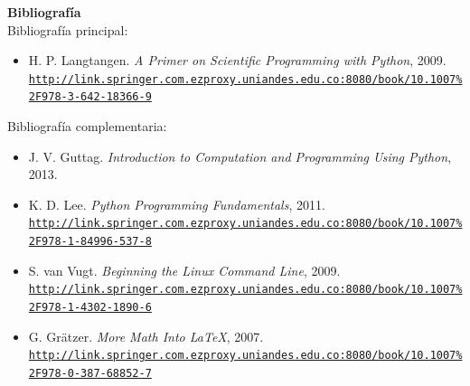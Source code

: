 \documentclass[letterpaper,10pt,onecolumn]{article}
\begin{document}
\noindent\textbf{\large {} \quad Bibliografía}\\[-0.2cm]

\noindent\normalsize Bibliografía principal:


\begin{itemize}
	\item H. P. Langtangen. \textit{A Primer on Scientific Programming with Python}, 2009.\\
	\href{http://link.springer.com.ezproxy.uniandes.edu.co:8080/book/10.1007\%2F978-3-642-18366-9}{\nolinkurl{http://link.springer.com.ezproxy.uniandes.edu.co:8080/book/10.1007\%2F978-3-642-18366-9}}\\[-0.6cm]
\end{itemize}

\noindent\normalsize Bibliografía complementaria:

\begin{itemize}
	\item J. V. Guttag. \textit{Introduction to Computation and Programming Using Python}, 2013.
	\item K. D. Lee. \textit{Python Programming Fundamentals}, 2011. \\
	\href{http://link.springer.com.ezproxy.uniandes.edu.co:8080/book/10.1007\%2F978-1-84996-537-8}{\nolinkurl{http://link.springer.com.ezproxy.uniandes.edu.co:8080/book/10.1007\%2F978-1-84996-537-8}}\\[-0.6cm]
	\item S. van Vugt. \textit{Beginning the Linux Command Line}, 2009.\\
	\href{http://link.springer.com.ezproxy.uniandes.edu.co:8080/book/10.1007\%2F978-1-4302-1890-6}{\nolinkurl{http://link.springer.com.ezproxy.uniandes.edu.co:8080/book/10.1007\%2F978-1-4302-1890-6}}\\[-0.6cm]
	\item G. Gr\"atzer. \textit{More Math Into  \LaTeX}, 2007.\\
	\href{http://link.springer.com.ezproxy.uniandes.edu.co:8080/book/10.1007\%2F978-0-387-68852-7}{\nolinkurl{http://link.springer.com.ezproxy.uniandes.edu.co:8080/book/10.1007\%2F978-0-387-68852-7}}
\end{itemize}
\end{document}
